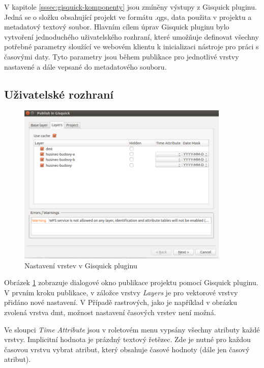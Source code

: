V kapitole \ref{sssec:gisquick-komponenty} jsou zmíněny výstupy z Gisquick
pluginu. Jedná se o složku obsahující projekt ve formátu .qgs, data
použita v projektu a metadatový textový soubor. Hlavním cílem úprav
Gisquick pluginu bylo vytvoření jednoduchého uživatelského rozhraní,
které umožňuje definovat všechny potřebné parametry sloužící ve
webovém klientu k inicializaci nástroje pro práci s časovými daty. Tyto
parametry jsou během publikace pro jednotlivé vrstvy nastavené a dále
vepsané do metadatového souboru.

\subsection{Uživatelské rozhraní}
\label{sssec:plugin-ui}

\begin{figure}[h!]
\centering
\includegraphics[width=0.9\textwidth]{../img/gisquick-plugin.png}
\caption{Nastavení vrstev v Gisquick pluginu}
\label{fig:gisquick-plugin-layers}
\end{figure}

Obrázek \ref{fig:gisquick-plugin-layers} zobrazuje dialogové okno publikace
projektu pomocí Gisquick pluginu. V prvním kroku publikace, v záložce
vrstvy \textit{Layers} je pro vektorové vrstvy přidáno nové nastavení. V
Případě rastrových, jako je například v obrázku zvolená vrstva dmt,
možnost nastavení časových vrstev není možná.

Ve sloupci \textit{Time Attribute} jsou v roletovém menu vypsány
všechny atributy každé vrstvy. Implicitní hodnota je prázdný textový
řetězec. Zde je nutné pro každou časovou vrstvu vybrat atribut, který
obsahuje časové hodnoty (dále jen časový atribut).

